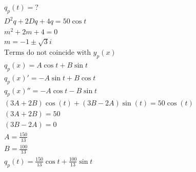\documentclass[12pt]{article}
\begin{document}
\begin{equation}
  \begin{split}
    q_p(t)=?\\
    D^2q+2Dq+4q=50\cos t\\
    m^2+2m+4=0\\
    m=-1\pm\sqrt{3}i\\
    \text{Terms do not coincide with } y_p(x)\\
    q_p(x)=A\cos t + B\sin t\\
    q_p(x)'=-A\sin t + B\cos t\\
    q_p(x)''=-A\cos t - B\sin t\\
    (3A+2B)\cos(t)+(3B-2A)\sin(t)=50\cos(t)\\
    (3A+2B)=50\\
    (3B-2A)=0\\
    A=\frac{150}{13}\\
    B=\frac{100}{13}\\
    q_p(t)=\frac{150}{13}\cos t + \frac{100}{13}\sin t
  \end{split}
  \label{11}
\end{equation}
\hline
\end{document}
